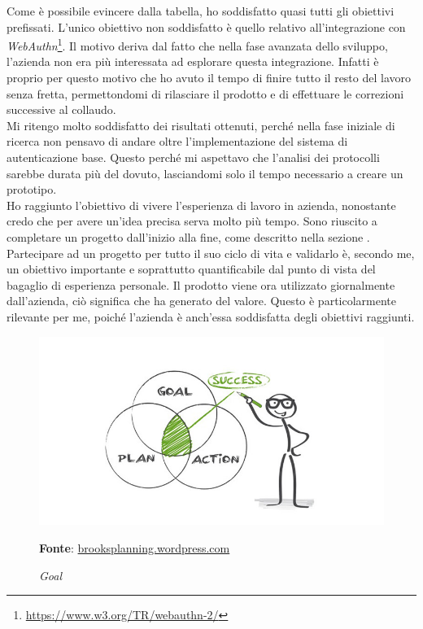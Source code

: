 Come è possibile evincere dalla tabella, ho soddisfatto quasi tutti gli obiettivi prefissati. L'unico obiettivo non soddisfatto è quello relativo all'integrazione con \textit{WebAuthn}\footnote{\url{https://www.w3.org/TR/webauthn-2/}}. Il motivo deriva dal fatto che nella fase avanzata dello sviluppo, l'azienda non era più interessata ad esplorare questa integrazione. Infatti è proprio per questo motivo che ho avuto il tempo di finire tutto il resto del lavoro senza fretta, permettondomi di rilasciare il prodotto e di effettuare le correzioni successive al collaudo. \\
Mi ritengo molto soddisfatto dei risultati ottenuti, perché nella fase iniziale di ricerca non pensavo di andare oltre l'implementazione del sistema di autenticazione base. Questo perché mi aspettavo che l'analisi dei protocolli sarebbe durata più del dovuto, lasciandomi solo il tempo necessario a creare un prototipo. \\
Ho raggiunto l'obiettivo di vivere l'esperienza di lavoro in azienda, nonostante credo che per avere un'idea precisa serva molto più tempo.
Sono riuscito a completare un progetto dall'inizio alla fine, come descritto nella sezione . Partecipare ad un progetto per tutto il suo ciclo di vita e validarlo è, secondo me, un obiettivo importante e soprattutto quantificabile dal punto di vista del bagaglio di esperienza personale.
Il prodotto viene ora utilizzato giornalmente dall'azienda, ciò significa che ha generato del valore. Questo è particolarmente rilevante per me, poiché l'azienda è anch'essa soddisfatta degli obiettivi raggiunti.

    \begin{figure}[ht]
        \centering
        \includegraphics[width=1\textwidth]{immagini/success.jpg}
        \caption{\textit{Goal}}
        \textbf{Fonte}:
        \href{https://brooksplanning.wordpress.com/2016/06/12/action-plan-for-success/
}{brooksplanning.wordpress.com}
        \label{fig: Goal}
    \end{figure}

